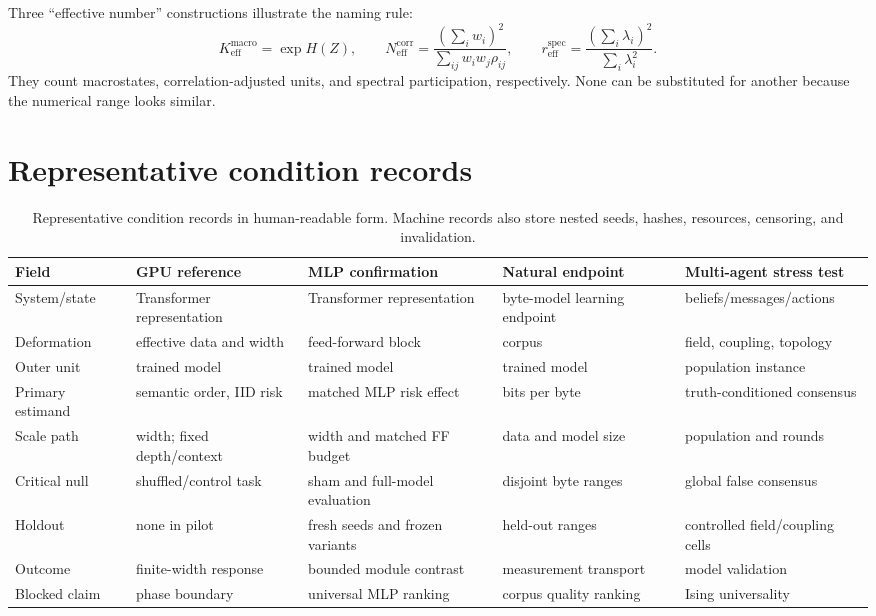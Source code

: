 Three ``effective number'' constructions illustrate the naming rule:
\begin{equation}
 K_{\mathrm{eff}}^{\mathrm{macro}}=\exp H(Z),\qquad
 N_{\mathrm{eff}}^{\mathrm{corr}}=
 \frac{(\sum_i w_i)^2}{\sum_{ij}w_iw_j\rho_{ij}},\qquad
 r_{\mathrm{eff}}^{\mathrm{spec}}=
 \frac{(\sum_i\lambda_i)^2}{\sum_i\lambda_i^2}.
\end{equation}
They count macrostates, correlation-adjusted units, and spectral participation,
respectively. None can be substituted for another because the numerical range
looks similar.

\section{Representative condition records}
\label{app:phasecards}

\begin{table}[tbp]
\centering\scriptsize
\begin{tabularx}{\linewidth}{@{}p{22mm}YYYY@{}}
\toprule
Field & GPU reference & MLP confirmation & Natural endpoint & Multi-agent
stress test \\
\midrule
System/state & Transformer representation & Transformer representation &
byte-model learning endpoint & beliefs/messages/actions \\
Deformation & effective data and width & feed-forward block & corpus & field,
coupling, topology \\
Outer unit & trained model & trained model & trained model & population instance \\
Primary estimand & semantic order, IID risk & matched MLP risk effect & bits per
byte & truth-conditioned consensus \\
Scale path & width; fixed depth/context & width and matched FF budget & data and
model size & population and rounds \\
Critical null & shuffled/control task & sham and full-model evaluation & disjoint
byte ranges & global false consensus \\
Holdout & none in pilot & fresh seeds and frozen variants & held-out ranges &
controlled field/coupling cells \\
Outcome & finite-width response & bounded module contrast & measurement
transport & model validation \\
Blocked claim & phase boundary & universal MLP ranking & corpus quality ranking &
Ising universality \\
\bottomrule
\end{tabularx}
\caption{Representative condition records in human-readable form. Machine records also
store nested seeds, hashes, resources, censoring, and invalidation.}
\label{tab:phasecards}
\end{table}

